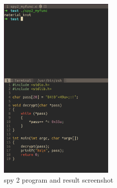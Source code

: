 \documentclass{article}
\theoremstyle{remark}
\theoremstyle{definition}
\begin{document}
    \begin{figure}[!htbp]
        \centering
        \includegraphics[width=0.5\textwidth]{img/spy2_secret_result.png}
        \caption{spy 2 program and result screenshot}
        \label{fig:spy_2_secret_result}
    \end{figure}
\end{document}
